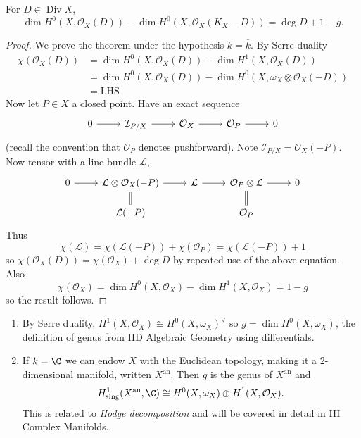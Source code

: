 \documentclass[a4paper]{article}
\newcommand{\sh}[1]{\mathcal{#1}} %
\DeclareMathOperator{\Div}{Div} %
\begin{document}
\begin{theorem}
  For \(D \in \Div X\),
  \[
    \dim H^0(X, \sh O_X(D)) - \dim H^0(X, \sh O_X(K_X - D)) = \deg D + 1 - g.
  \]
\end{theorem}

\begin{proof}
  We prove the theorem under the hypothesis \(k = \overline k\). By Serre duality
  \begin{align*}
    \chi(\sh O_X(D))
    &= \dim H^0(X, \sh O_X(D)) - \dim H^1(X, \sh O_X(D)) \\
    &= \dim H^0(X, \sh O_X(D)) - \dim H^0(X, \omega_X \otimes \sh O_X(-D)) \\
    &= \mathrm{LHS}
  \end{align*}
  Now let \(P \in X\) a closed point. Have an exact sequence
  \[
    \begin{tikzcd}
      0 \ar[r] & \sh I_{P/X} \ar[r] & \sh O_X \ar[r] & \sh O_P \ar[r] & 0
    \end{tikzcd}
  \]
  (recall the convention that \(\sh O_P\) denotes pushforward). Note \(\sh I_{P/X} = \sh O_X(-P)\). Now tensor with a line bundle \(\sh L\),
  \[
    \begin{tikzcd}[row sep=scriptsize]
      0 \ar[r] & \sh L \otimes \sh O_X(-P) \ar[r] \ar[d, equal] & \sh L \ar[r] & \sh O_P \otimes \sh L \ar[r] \ar[d, equal] & 0 \\
      & \sh L(-P) & & \sh O_P
    \end{tikzcd}
  \]
  Thus
  \[
    \chi(\sh L) = \chi(\sh L(-P)) + \chi(\sh O_P) = \chi(\sh L(-P)) + 1
  \]
  so \(\chi(\sh O_X(D)) = \chi(\sh O_X) + \deg D\) by repeated use of the above equation. Also
  \[
    \chi(\sh O_X) = \dim H^0(X, \sh O_X) - \dim H^1(X, \sh O_X) = 1 - g
  \]
  so the result follows.
\end{proof}

\begin{remark}\leavevmode
  \begin{enumerate}
  \item By Serre duality, \(H^1(X, \sh O_X) \cong H^0(X, \omega_X)^\vee\) so \(g = \dim H^0(X, \omega_X)\), the definition of genus from IID Algebraic Geometry using differentials.
  \item If \(k = \C\) we can endow \(X\) with the Euclidean topology, making it a \(2\)-dimensional manifold, written \(X^{\mathrm{an}}\). Then \(g\) is the genus of \(X^{\mathrm{an}}\) and
    \[
      H^1_{\mathrm{sing}}(X^{\mathrm{an}}, \C) \cong H^0(X, \omega_X) \oplus H^1(X, \sh O_X).
    \]
    This is related to \emph{Hodge decomposition} and will be covered in detail in III Complex Manifolds.
  \end{enumerate}
\end{remark}
\end{document}
